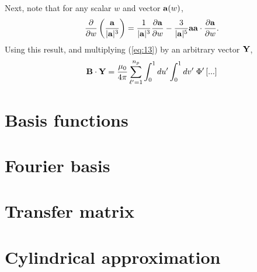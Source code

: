 Next, note that for any scalar $w$ and vector ${\mathbf a}(w)$,
\begin{equation}
\frac{\partial}{\partial w}
\left(\frac{{\mathbf a}}{|{\mathbf a}|^3}\right)
=
\frac{1}{|{\mathbf a}|^3}
\frac{\partial{\mathbf a}}{\partial w}
-
\frac{3}{|{\mathbf a}|^5}
{\mathbf a}{\mathbf a}\cdot
\frac{\partial{\mathbf a}}{\partial w}.
\end{equation}
Using this result, and multiplying (\ref{eq:13}) by an arbitrary vector ${\mathbf Y}$,
\begin{eqnarray}
{\mathbf B}\cdot{\mathbf Y}
= \frac{\mu_0}{4\pi}
\sum_{\ell'=1}^{n_p} \int_0^1 du' \int_0^1 dv' \; \Phi'
\left[
...
\right]
\end{eqnarray}

\section{Basis functions}

\section{Fourier basis}

\section{Transfer matrix}

\section{Cylindrical approximation}



\label{sec:requirements}

